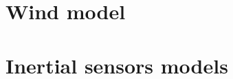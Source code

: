 \documentclass[a4paper,11pt]{report}
\begin{document}
\section{Wind model}

\section{Inertial sensors models}

\end{document}
